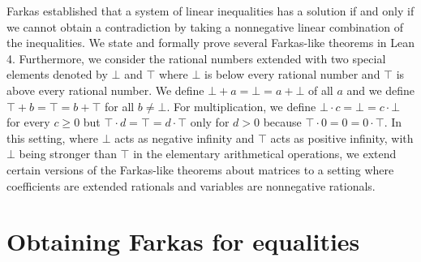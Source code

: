 \documentclass[]{article}
\begin{document}
	

Farkas established that a system of linear inequalities has a solution if and only if we cannot obtain
a contradiction by taking a nonnegative linear combination of the inequalities.
We state and formally prove several Farkas-like theorems in Lean 4.
Furthermore, we consider the rational numbers extended with two special elements denoted by $\bot$ and $\top$
where $\bot$ is below every rational number and $\top$ is above every rational number.
We define $\bot + a = \bot = a + \bot$ of all $a$ and we define $\top + b = \top = b + \top$ for all $b \neq \bot$.
For multiplication, we define $\bot \cdot c = \bot = c \cdot \bot$ for every $c \ge 0$ but
$\top \cdot d = \top = d \cdot \top$ only for $d > 0$ because $\top \cdot 0 = 0 = 0 \cdot \top$.
In this setting, where $\bot$ acts as negative infinity and $\top$ acts as positive infinity, with
$\bot$ being stronger than $\top$ in the elementary arithmetical operations, we extend certain versions of
the Farkas-like theorems about matrices to a setting where coefficients are extended rationals and
variables are nonnegative rationals.


\section {Obtaining Farkas for equalities}
\end{document}
